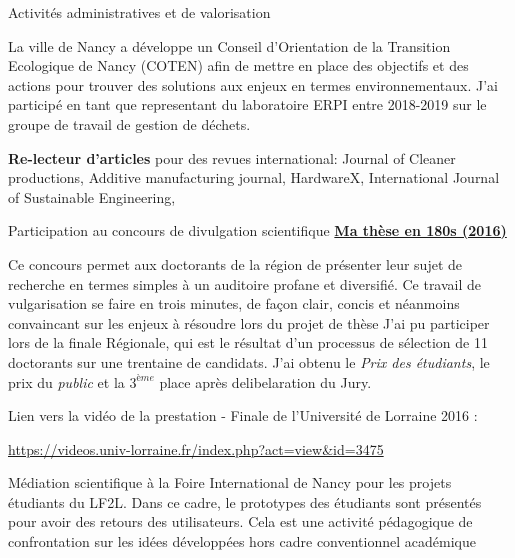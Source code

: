 \begin{rubric}{Activités administratives et de valorisation}

\entry*[2018-2019]
La ville de Nancy a développe un Conseil d'Orientation de la Transition Ecologique de Nancy (COTEN) afin de mettre en place des objectifs et des actions pour trouver des solutions  aux enjeux en termes environnementaux. 
J'ai participé en tant que representant du laboratoire ERPI entre 2018-2019 sur le groupe de travail de gestion de déchets.

\entry*[ ] \textbf{Re-lecteur d'articles} pour des revues international: Journal of Cleaner productions, Additive manufacturing journal, HardwareX, International Journal of Sustainable Engineering, 


\entry*[2016] Participation au concours de divulgation scientifique \href{http://videos.univ-lorraine.fr/index.php?act=view&id=3475}{\textbf{Ma thèse en 180s (2016)}} 

Ce concours permet aux doctorants de la région de présenter leur sujet de recherche en termes simples à un auditoire profane et diversifié.   Ce travail de vulgarisation se faire en trois minutes, de façon clair, concis et néanmoins convaincant sur les enjeux à résoudre lors du projet de thèse
J’ai pu participer lors de la finale Régionale, qui est le résultat d’un processus de sélection de 11 doctorants sur une trentaine de candidats. 
J'ai obtenu le \textit{Prix des étudiants}, le prix du \textit{public} et la $3^{ème}$ place après delibelaration du Jury.

Lien vers la vidéo de la prestation - Finale de l'Université de Lorraine 2016 : 

\url{https://videos.univ-lorraine.fr/index.php?act=view&id=3475}



\entry*[]
Médiation scientifique à la Foire International de Nancy pour les projets étudiants du LF2L. Dans ce cadre, le prototypes des étudiants sont présentés pour avoir des retours des utilisateurs. Cela est une activité pédagogique de confrontation sur les idées développées hors cadre conventionnel académique

\end{rubric}